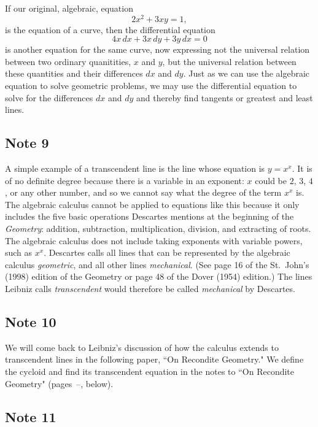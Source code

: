 \documentclass[twoside,openright]{article}
\begin{document}
If our original, algebraic, equation
$$2x^2 + 3xy = 1,$$
is the equation of a curve, then the differential equation
$$4x\,dx + 3x\,dy + 3y\,dx = 0$$
is another equation for the same curve, now expressing not the
universal relation between two ordinary quanitities, $x$ and $y$, but
the universal relation between these quantities and their differences
$dx$ and $dy$.  Just as we can use the algebraic equation to solve
geometric problems, we may use the differential equation to solve for
the differences $dx$ and $dy$ and thereby find tangents or greatest
and least lines.

\subsection*{Note 9}
\label{cnm9}

A simple example of a transcendent line is the line whose equation is
$y = x^x$.  It is of no definite degree because there is a variable in
an exponent: $x$ could be $2$, $3$, $4$, or any other number, and so
we cannot say what the degree of the term $x^x$ is.  The algebraic
calculus cannot be applied to equations like this because it only
includes the five basic operations Descartes mentions at the beginning
of the {\em Geometry}: addition, subtraction, multiplication,
division, and extracting of roots.  The algebraic calculus does not
include taking exponents with variable powers, such as $x^x$.
Descartes calls all lines that can be represented by the algebraic
calculus {\em geometric}, and all other lines {\em mechanical}. (See
page 16 of the St.\ John's (1998) edition of the Geometry or page 48
of the Dover (1954) edition.) The lines Leibniz calls {\em
  transcendent} would therefore be called {\em mechanical} by
Descartes.

\subsection*{Note 10}
\label{cnm10}

We will come back to Leibniz's discussion of how the calculus extends
to transcendent lines in the following paper, ``On Recondite
Geometry."  We define the cycloid and find its transcendent equation
in the notes to ``On Recondite Geometry"
(pages~\pageref{cycloid}--\pageref{ecycloid}, below).

\subsection*{Note 11}
\label{cnm11}
\end{document}
